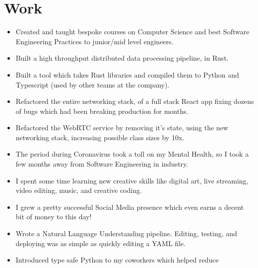 \documentclass{jcgcv}
\begin{document}
\begin{column}
  \section{Work}
  \begin{itemize}\setlength\itemsep{0.25em}
    \item Created and taught bespoke courses on Computer Science and best
          Software Engineering Practices to junior/mid level engineers.
  \end{itemize}
  \vgap
  \begin{itemize}\setlength\itemsep{0.25em}
    \item Built a high throughput distributed data processing pipeline, in Rust.
    \item Built a tool which takes Rust libraries and compiled them to Python
          and Typescript (used by other teams at the company).
    \item Refactored the entire networking stack, of a full stack React app
          fixing dozens of bugs which had been breaking production for months.
    \item Refactored the WebRTC service by removing it's state, using the
          new networking stack, increasing possible class sizes by 10x.
  \end{itemize}
  \vgap
  \begin{itemize}\setlength\itemsep{0.25em}
    \item The period during Coronavirus took a toll on my Mental Health, so I
          took a few months away from Software Engineering in industry.
    \item I spent some time learning new creative skills like digital art, live
          streaming, video editing, music, and creative coding.
    \item I grew a pretty successful Social Media presence which even earns a
          decent bit of money to this day!
  \end{itemize}
  \vgap
  \begin{itemize}\setlength\itemsep{0.25em}
    \item Wrote a Natural Language Understanding pipeline. Editing, testing,
          and deploying was as simple as quickly editing a YAML file.
    \item Introduced type safe Python to my coworkers which helped reduce

\end{itemize}
\end{column}
\end{document}
